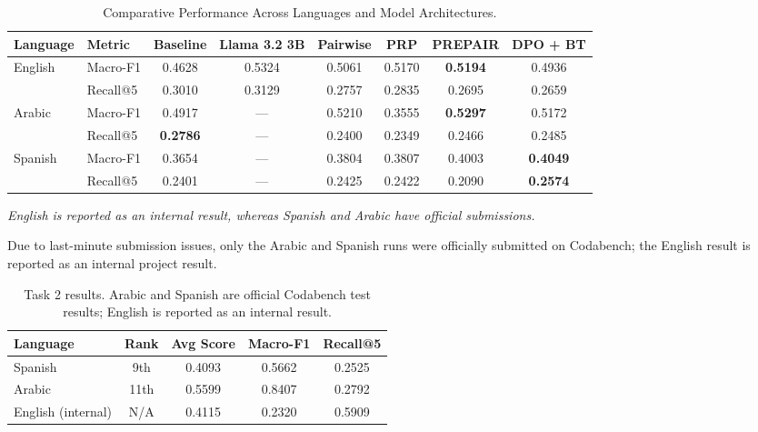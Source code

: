 \documentclass[
]{ceurart}
\begin{document}
\begin{table}[ht]
\centering
\caption{Comparative Performance Across Languages and Model Architectures.}
\label{tab:task2_results}
\begin{tabular}{llcccccc}
\toprule
\textbf{Language} & \textbf{Metric} & \textbf{Baseline} & \textbf{Llama 3.2 3B} & \textbf{Pairwise} & \textbf{PRP} & \textbf{PREPAIR} & \textbf{DPO + BT}\\
\midrule
\multirow{2}{*}{English} & Macro-F1 & 0.4628 & 0.5324 & 0.5061 & 0.5170 & \textbf{0.5194} & 0.4936\\
& Recall@5 & 0.3010 & 0.3129 & 0.2757 & 0.2835 & 0.2695 & 0.2659\\
\midrule
\multirow{2}{*}{Arabic}  & Macro-F1 & 0.4917 & --- & 0.5210 & 0.3555 & \textbf{0.5297} & 0.5172 \\
& Recall@5 & \textbf{0.2786} & --- & 0.2400 & 0.2349 & 0.2466 & 0.2485 \\
\midrule
\multirow{2}{*}{Spanish} & Macro-F1 & 0.3654 & --- & 0.3804 & 0.3807 & 0.4003 & \textbf{0.4049} \\
& Recall@5 & 0.2401 & --- & 0.2425 & 0.2422 & 0.2090 & \textbf{0.2574} \\
\bottomrule
\end{tabular}

\par\smallskip
\footnotesize\textit{English is reported as an internal result, whereas Spanish and Arabic have official submissions.}
\end{table}

Due to last-minute submission issues, only the Arabic and Spanish runs were officially submitted on Codabench; the English result is reported as an internal project result.

\begin{table}[h]
  \caption{Task 2 results. Arabic and Spanish are official Codabench test results; English is reported as an internal result.}
  \label{tab:task2_codabench}
  \centering
  \begin{tabular}{lcccc}
    \toprule
    Language & Rank & Avg Score & Macro-F1 & Recall@5\\
    \midrule
    Spanish & 9th & 0.4093 &  0.5662 & 0.2525\\
    Arabic & 11th & 0.5599 & 0.8407 &  0.2792\\
    English (internal) & N/A & 0.4115 & 0.2320 & 0.5909\\
    \bottomrule
  \end{tabular}
\end{table}
\end{document}
